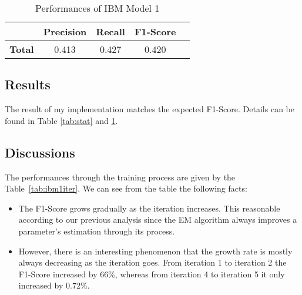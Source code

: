 \begin{table}[ht]  %
\centering  %
\caption{Performances of IBM Model 1}
\begin{tabular}{lcccc }
\hline
&    \textbf{Precision} & \textbf{Recall} & \textbf{F1-Score}  \\
\hline
 \textbf{Total} & 0.413 & 0.427 & 0.420 \\
\hline
\end{tabular}
\label{tab:ibm1}
\end{table}

\subsection{\textbf{Results}}

The result of my implementation matches the expected F1-Score. Details can be found in Table \ref{tab:stat}
 and \ref{tab:ibm1}.


\subsection{\textbf{Discussions}}

The performances through the training process are given by the Table~\ref{tab:ibm1iter}. We can see from the table the following facts:
\begin{itemize}
    \item The F1-Score grows gradually as the iteration increases. This reasonable according to our previous analysis since the EM algorithm always improves a parameter's estimation through its process.
    \item However, there is an interesting phenomenon that the growth rate is mostly always decreasing as the iteration goes. From iteration 1 to iteration 2 the F1-Score increased by 66\%, whereas from iteration 4 to iteration 5 it only increased by 0.72\%. 
\end{itemize}

